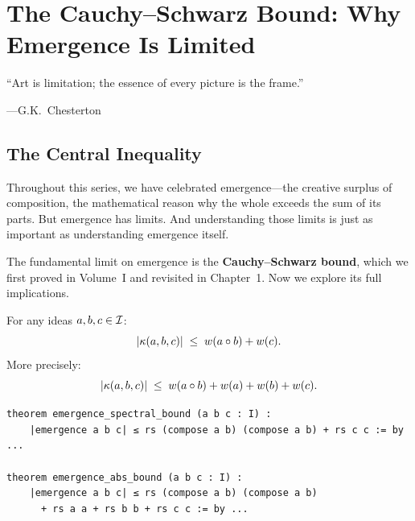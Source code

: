 %


\chapter{The Cauchy--Schwarz Bound: Why Emergence Is Limited}
\label{ch:cauchy-schwarz}

\epigraph{``Art is limitation; the essence of every picture is the frame.''}
{---G.K.\ Chesterton}


\section{The Central Inequality}

Throughout this series, we have celebrated emergence---the creative surplus of
composition, the mathematical reason why the whole exceeds the sum of its parts.
But emergence has limits. And understanding those limits is just as important
as understanding emergence itself.

The fundamental limit on emergence is the \textbf{Cauchy--Schwarz bound}, which
we first proved in Volume~I and revisited in Chapter~1. Now we explore its
full implications.

\begin{theorem}
\label{thm:cs-bound-full}
For any ideas $a, b, c \in \mathcal{I}$:
\[
  |\kappa(a, b, c)| \;\leq\; w(a \circ b) + w(c).
\]
More precisely:
\[
  |\kappa(a, b, c)| \;\leq\; w(a \circ b) + w(a) + w(b) + w(c).
\]
\end{theorem}

\begin{lstlisting}[caption={Cauchy--Schwarz bounds (IDT\_v3\_Emergence.lean)}]
theorem emergence_spectral_bound (a b c : I) :
    |emergence a b c| ≤ rs (compose a b) (compose a b) + rs c c := by ...

theorem emergence_abs_bound (a b c : I) :
    |emergence a b c| ≤ rs (compose a b) (compose a b)
      + rs a a + rs b b + rs c c := by ...
\end{lstlisting}


